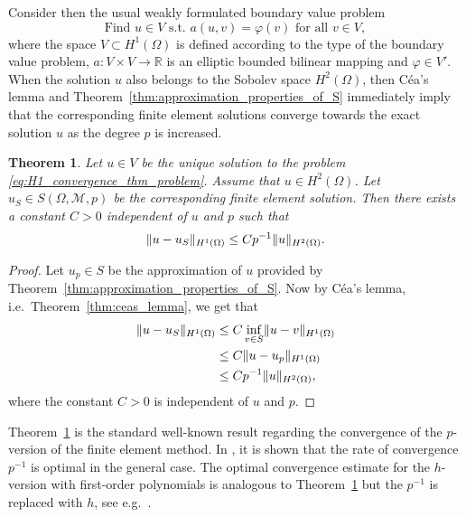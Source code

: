 \documentclass[english, 12pt, a4paper, sci, utf8, a-2b, online]{aaltothesis}
\theoremstyle{definition}
\theoremstyle{plain}
\newtheorem{theorem}{Theorem}[section]
\DeclarePairedDelimiter\norm{\lVert}{\rVert}
\numberwithin{equation}{section}
\begin{document}
Consider then the usual weakly formulated boundary value problem
\begin{equation}
    \label{eq:H1_convergence_thm_problem}
    \text{Find } u \in V \text{ s.t.\ }
    a(u,v) = \varphi(v) \text{ for all } v \in V,
\end{equation}
where the space $V \subset H^1(\Omega)$ is defined
according to the type of the boundary value problem,
$a: V \times V \to \mathbb{R}$ is an elliptic bounded bilinear mapping and $\varphi \in V'$.
When the solution $u$ also belongs to the Sobolev space $H^2(\Omega)$, then
Céa's lemma and Theorem~\ref{thm:approximation_properties_of_S} immediately imply that
the corresponding finite element solutions converge towards the exact solution $u$ as
the degree $p$ is increased.
\begin{theorem}
    \label{thm:H1_convergence_of_p_version}
    Let $u \in V$ be the unique solution to the problem 
    \eqref{eq:H1_convergence_thm_problem}.
    Assume that $u \in H^2(\Omega)$.
    Let $u_S \in S(\Omega, \mathcal{M}, p)$ be the corresponding
    finite element solution. Then there exists a constant $C > 0$
    independent of $u$ and $p$ such that
    \begin{equation*}
        \norm{u-u_S}_{H^1(\Omega)} \leq C p^{-1} \norm{u}_{H^2(\Omega)}.
    \end{equation*}
\end{theorem}
\begin{proof}
    Let $u_p \in S$ be the approximation of $u$ provided by
    Theorem~\ref{thm:approximation_properties_of_S}.
    Now by Céa's lemma, i.e.\ Theorem~\ref{thm:ceas_lemma}, we get that
    \begin{align*}
        \norm{u - u_S}_{H^1(\Omega)}
        &\leq C \inf_{v \in S} \norm{u - v}_{H^1(\Omega)} \\
        &\leq C \norm{u - u_p}_{H^1(\Omega)} \\
        &\leq C p^{-1} \norm{u}_{H^2(\Omega)},
    \end{align*}
    where the constant $C > 0$ is independent of $u$ and $p$.
\end{proof}

Theorem~\ref{thm:H1_convergence_of_p_version} is the standard
well-known result regarding the convergence of the $p$-version
of the finite element method. In \cite{babuskasuri1987},
it is shown that the rate of convergence $p^{-1}$ is optimal in the general case.
The optimal convergence estimate for the $h$-version with first-order polynomials
is analogous to Theorem~\ref{thm:H1_convergence_of_p_version}
but the $p^{-1}$ is replaced with $h$, see e.g.\ \cite{braess2007}.
\end{document}
